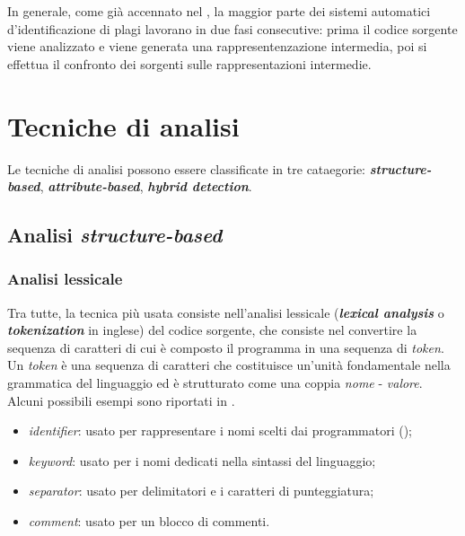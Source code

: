 

In generale, come già accennato nel , la maggior parte dei sistemi automatici d'identificazione di plagi lavorano in due fasi consecutive: prima il codice sorgente viene analizzato e viene generata una rappresentenzazione intermedia, poi si effettua il confronto dei sorgenti sulle rappresentazioni intermedie.

\section{Tecniche di analisi}

Le tecniche di analisi possono essere classificate in tre cataegorie: \textbf{\textit{structure-based}}, \textbf{\textit{attribute-based}}, \textbf{\textit{hybrid detection}}.

\subsection{Analisi \textit{structure-based}}

\subsubsection{Analisi lessicale}
Tra tutte, la tecnica più usata consiste nell'analisi lessicale (\textbf{\textit{lexical analysis}} o \textbf{\textit{tokenization}} in inglese) del codice sorgente, che consiste nel convertire la sequenza di caratteri di cui è composto il programma in una sequenza di \textit{token}.
%
Un \textit{token} è una sequenza di caratteri che costituisce un'unità fondamentale nella grammatica del linguaggio ed è strutturato come una coppia \textit{nome} - \textit{valore}.
%
Alcuni possibili esempi sono riportati in .

\begin{itemize}
    \item \textit{identifier}: usato per rappresentare i nomi scelti dai programmatori ();
    \item \textit{keyword}: usato per i nomi dedicati nella sintassi del linguaggio;
    \item \textit{separator}: usato per delimitatori e i caratteri di punteggiatura;
    \item \textit{comment}: usato per un blocco di commenti.
\end{itemize}

